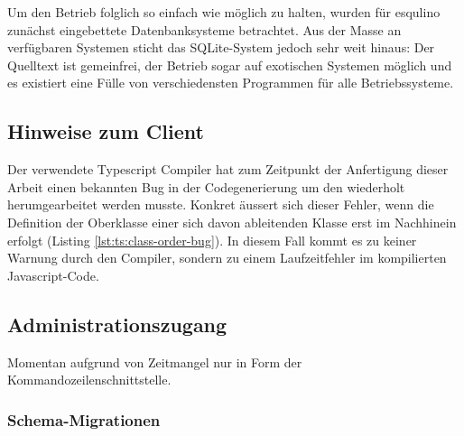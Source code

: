 Um den Betrieb folglich so einfach wie möglich zu halten, wurden für esqulino zunächst eingebettete Datenbanksysteme betrachtet. Aus der Masse an verfügbaren Systemen sticht das SQLite-System jedoch sehr weit hinaus: Der Quelltext ist gemeinfrei, der Betrieb sogar auf exotischen Systemen möglich und es existiert eine Fülle von verschiedensten Programmen für alle Betriebssysteme.


\subsection{Hinweise zum Client}

Der verwendete Typescript Compiler hat zum Zeitpunkt der Anfertigung dieser Arbeit einen bekannten Bug in der Codegenerierung \cite{ts-compiler-class-order-bug} um den wiederholt herumgearbeitet werden musste. Konkret äussert sich dieser Fehler, wenn die Definition der Oberklasse einer sich davon ableitenden Klasse erst im Nachhinein erfolgt (Listing \ref{lst:ts:class-order-bug}). In diesem Fall kommt es zu keiner Warnung durch den Compiler, sondern zu einem Laufzeitfehler im kompilierten Javascript-Code.



\subsection{Administrationszugang}
\label{sec:implementation-administration}

Momentan aufgrund von Zeitmangel nur in Form der Kommandozeilenschnittstelle.

\subsubsection{Schema-Migrationen}
\label{sec:implementation-migration}

